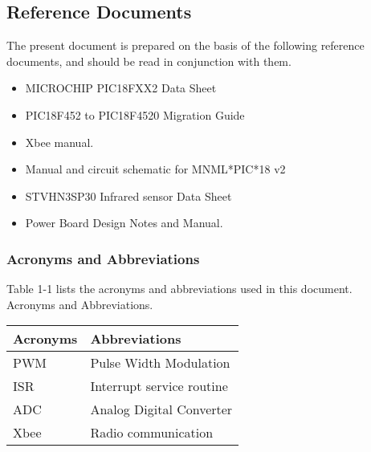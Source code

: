 \documentclass[MTRX3700report.tex]{subfiles}
\begin{document}
\subsection{Reference Documents}
The present document is prepared on the basis of the following reference documents, and should be read in conjunction with them.\\
\begin {itemize}
	\item  MICROCHIP PIC18FXX2 Data Sheet
	\item  PIC18F452 to PIC18F4520 Migration Guide
	\item Xbee manual.
	\item Manual and circuit schematic for MNML*PIC*18 v2
	\item STVHN3SP30 Infrared sensor Data Sheet
	\item Power Board Design Notes and Manual.

\end{itemize}

\subsubsection{ Acronyms and Abbreviations}
Table   1-1 lists the acronyms and abbreviations used in this document.\\
Acronyms and Abbreviations.
\begin{center}
	\begin{tabular}{| l | l | }
	\hline
	Acronyms & Abbreviations		\\ \hline
	PWM	& Pulse Width Modulation	\\ \hline	
	ISR    & Interrupt service routine \\ \hline
	ADC  & Analog Digital Converter   \\ \hline
	Xbee & Radio communication	\\ 
	\hline
	\end{tabular}
\end{center}
	


		
	
\end{document}
